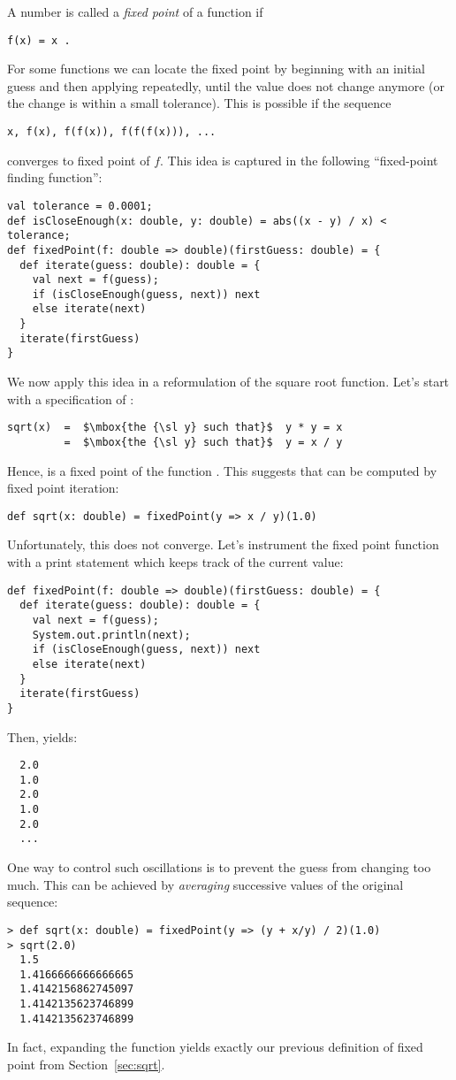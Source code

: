 \documentclass[a4paper,12pt,twoside,titlepage]{book}
\begin{document}
A number  is called a {\em fixed point} of a function  if
\begin{lstlisting}
f(x) = x .
\end{lstlisting}
For some functions  we can locate the fixed point by beginning
with an initial guess and then applying  repeatedly, until the
value does not change anymore (or the change is within a small
tolerance). This is possible if the sequence
\begin{lstlisting}
x, f(x), f(f(x)), f(f(f(x))), ...
\end{lstlisting}
converges to fixed point of $f$. This idea is captured in
the following ``fixed-point finding function'':
\begin{lstlisting}
val tolerance = 0.0001;
def isCloseEnough(x: double, y: double) = abs((x - y) / x) < tolerance;
def fixedPoint(f: double => double)(firstGuess: double) = {
  def iterate(guess: double): double = {
    val next = f(guess);
    if (isCloseEnough(guess, next)) next
    else iterate(next)
  }
  iterate(firstGuess)
}
\end{lstlisting}
We now apply this idea in a reformulation of the square root function.
Let's start with a specification of :
\begin{lstlisting}
sqrt(x)  =  $\mbox{the {\sl y} such that}$  y * y = x
         =  $\mbox{the {\sl y} such that}$  y = x / y
\end{lstlisting}
Hence,  is a fixed point of the function .
This suggests that  can be computed by fixed point iteration:
\begin{lstlisting}
def sqrt(x: double) = fixedPoint(y => x / y)(1.0)
\end{lstlisting}
Unfortunately, this does not converge. Let's instrument the fixed point
function with a print statement which keeps track of the current
 value:
\begin{lstlisting}
def fixedPoint(f: double => double)(firstGuess: double) = {
  def iterate(guess: double): double = {
    val next = f(guess);
    System.out.println(next);
    if (isCloseEnough(guess, next)) next
    else iterate(next)
  }
  iterate(firstGuess)
}
\end{lstlisting}
Then,  yields:
\begin{lstlisting}
  2.0
  1.0
  2.0
  1.0
  2.0
  ...
\end{lstlisting}
One way to control such oscillations is to prevent the guess from changing too much. 
This can be achieved by {\em averaging} successive values of the original sequence:
\begin{lstlisting}
> def sqrt(x: double) = fixedPoint(y => (y + x/y) / 2)(1.0)
> sqrt(2.0)
  1.5
  1.4166666666666665
  1.4142156862745097
  1.4142135623746899
  1.4142135623746899
\end{lstlisting}
In fact, expanding the  function yields exactly our 
previous definition of fixed point from Section~\ref{sec:sqrt}.
\end{document}
